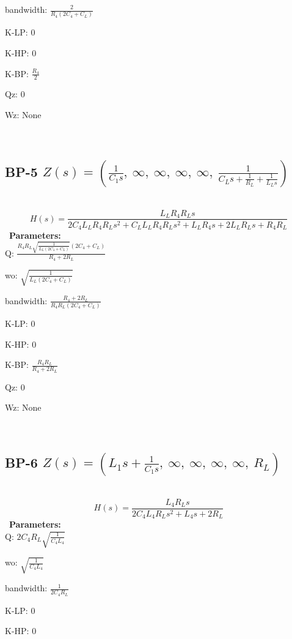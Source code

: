 \documentclass{article}
\begin{document}
bandwidth: $\frac{2}{R_{4} \left(2 C_{4} + C_{L}\right)}$\ 

K-LP: $0$\ 

K-HP: $0$\ 

K-BP: $\frac{R_{4}}{2}$\ 

Qz: $0$\ 

Wz: $\text{None}$\ 

\ 

\subsection{BP-5 $Z(s) = \left( \frac{1}{C_{1} s}, \  \infty, \  \infty, \  \infty, \  \infty, \  \frac{1}{C_{L} s + \frac{1}{R_{L}} + \frac{1}{L_{L} s}}\right)$ } \ 
\textbf{\[H(s) = \frac{L_{L} R_{4} R_{L} s}{2 C_{4} L_{L} R_{4} R_{L} s^{2} + C_{L} L_{L} R_{4} R_{L} s^{2} + L_{L} R_{4} s + 2 L_{L} R_{L} s + R_{4} R_{L}}\] } \ 
\textbf{Parameters:}\\ 

Q: $\frac{R_{4} R_{L} \sqrt{\frac{1}{L_{L} \left(2 C_{4} + C_{L}\right)}} \left(2 C_{4} + C_{L}\right)}{R_{4} + 2 R_{L}}$\ 

wo: $\sqrt{\frac{1}{L_{L} \left(2 C_{4} + C_{L}\right)}}$\ 

bandwidth: $\frac{R_{4} + 2 R_{L}}{R_{4} R_{L} \left(2 C_{4} + C_{L}\right)}$\ 

K-LP: $0$\ 

K-HP: $0$\ 

K-BP: $\frac{R_{4} R_{L}}{R_{4} + 2 R_{L}}$\ 

Qz: $0$\ 

Wz: $\text{None}$\ 

\ 

\subsection{BP-6 $Z(s) = \left( L_{1} s + \frac{1}{C_{1} s}, \  \infty, \  \infty, \  \infty, \  \infty, \  R_{L}\right)$ } \ 
\textbf{\[H(s) = \frac{L_{4} R_{L} s}{2 C_{4} L_{4} R_{L} s^{2} + L_{4} s + 2 R_{L}}\] } \ 
\textbf{Parameters:}\\ 

Q: $2 C_{4} R_{L} \sqrt{\frac{1}{C_{4} L_{4}}}$\ 

wo: $\sqrt{\frac{1}{C_{4} L_{4}}}$\ 

bandwidth: $\frac{1}{2 C_{4} R_{L}}$\ 

K-LP: $0$\ 

K-HP: $0$\ 
\end{document}
